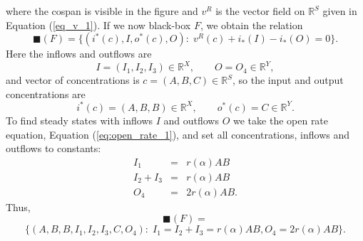 \documentclass{compositionalityarticle}
\newcommand{\R}{\mathbb{R}}
\theoremstyle{plain}
\theoremstyle{remark}
\begin{document}
where the cospan is visible in the figure and $v^R$ is the vector field on $\R^S$ given in
Equation (\ref{eq_v_1}).  If we now black-box $F$, we obtain the relation
\[   \blacksquare(F) = \{  (i^*(c),I,o^*(c),O) : \; v^R(c) + i_*(I) - i_*(O) = 0 \}. \] 
Here the inflows and outflows are
\[   I = (I_1, I_2, I_3) \in \R^X, \qquad O = O_4 \in \R^Y, \]
and vector of concentrations is $c = (A,B,C) \in \R^S$, so the input and output 
concentrations are 
\[   i^*(c) = (A,B,B) \in \R^X, \qquad o^*(c) = C \in \R^Y .\]
To find steady states with inflows $I$ and outflows $O$ we take the open rate equation, Equation (\ref{eq:open_rate_1}), and set all concentrations, inflows and outflows to constants:
\[
\begin{array}{rcr} 
 I_1 &=& r(\alpha) AB\, \\ 
 I_2 + I_3 &=& r(\alpha) AB\, \\ 
 O_4 &=& 2r(\alpha) AB.
\end{array}
\]
Thus, 
\begin{equation}   
\label{eq:black_1}
\blacksquare(F) = 
\end{equation}
\[ \{(A,B,B,I_1,I_2,I_3,C,O_4): \; I_1 = I_2 + I_3 = r(\alpha) AB , 
 O_4 = 2r(\alpha) AB \}.\]
\end{document}
